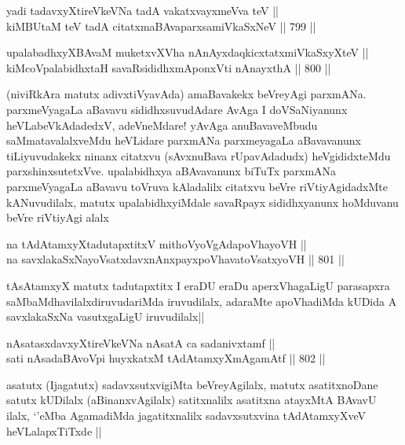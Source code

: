\begin{shl}
yadi tadavxyXtireVkeVNa tadA vakatxvayxmeVva teV ||  \\
kiMBUtaM teV tadA citatxmaBAvaparxsamiVkaSxNeV ||  799 ||  
\end{shl}
				
\begin{shl}
upalabadhxyXBAvaM muketxvXVha nAnAyxdaqkicxtatxmiVkaSxyXteV || \\
kiMcoVpalabidhxtaH savaRsididhxmAponxVti nAnayxthA ||  800 ||  
\end{shl}

\begin{artha}
(niviRkAra matutx adivxtiVyavAda) amaBavakekx beVreyAgi parxmANa. parxmeVyagaLa aBavavu sididhxsuvudAdare AvAga I doVSaNiyanunx heVLabeVkAdadedxV, adeVneMdare! yAvAga anuBavaveMbudu saMmatavalalxveMdu heVLidare parxmANa parxmeyagaLa aBavavanunx tiLiyuvudakekx ninanx citatxvu (sAvxnuBava rUpavAdadudx) heVgididxteMdu parxshinxsutetxVve. upalabidhxya aBAvavanunx biTuTx parxmANa parxmeVyagaLa aBavavu toVruva kAladalilx citatxvu beVre riVtiyAgidadxMte kANuvudilalx, matutx upalabidhxyiMdale savaRpayx sididhxyanunx hoMduvanu beVre riVtiyAgi alalx
\end{artha}


\begin{shl}
na tAdAtamxyXtadutapxtitxV mithoV\s yoVgAdapoVhayoVH || \\
na savxlakaSxNayoVsatxdavxnAnxpayxpoVhavatoVsatxyoVH ||  801 ||  
\end{shl}

\begin{artha}
tAsAtamxyX matutx tadutapxtitx I eraDU eraDu aperxVhagaLigU parasapxra saMbaMdhavilalxdiruvudariMda iruvudilalx, adaraMte apoVhadiMda kUDida A savxlakaSxNa vasutxgaLigU iruvudilalx||
\end{artha}


\begin{shl}
nAsatasxdavxyXtireVkeVNa nAsatA ca sadanivxtamf ||  \\
sati nAsadaBAvoV\s pi huyxkatxM tAdAtamxyXmAgamAtf ||  802 ||  
\end{shl}

\begin{artha}
asatutx (Ijagatutx) sadavxsutxvigiMta beVreyAgilalx, matutx asatitxnoDane satutx kUDilalx (aBinanxvAgilalx) satitxnalilx asatitxna atayxMtA BAvavU ilalx, `\stext'eMba AgamadiMda jagatitxnalilx sadavxsutxvina tAdAtamxyXveV heVLalapxTiTxde ||
\end{artha}


